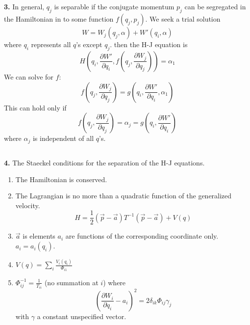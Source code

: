 \documentclass{article}
\begin{document}
	\subsection*{}
	\textbf{3.} In general, $q_j$ is separable if the conjugate momentum $p_j$ can be segregated in the Hamiltonian in to some function $f(q_j, p_j)$.
	We seek a trial solution
	\begin{equation*}
		W = W_j(q_j, \alpha) + W'(q_i, \alpha)
	\end{equation*}
	where $q_i$ represents all $q$'s except $q_j$.
	then the H-J equation is
	\begin{equation*}
		H\left(q_i, \frac{\partial W'}{\partial q_i}, f\left(q_j, \frac{\partial W_j}{\partial q_j}\right)\right) = \alpha_1
	\end{equation*}
	We can solve for $f$:
	\begin{equation*}
		f\left(q_j, \frac{\partial W_j}{\partial q_j}\right) = g\left(q_i, \frac{\partial W'}{\partial q_i}, \alpha_1\right)
	\end{equation*}
	This can hold only if
	\begin{equation*}
		f\left(q_j, \frac{\partial W_j}{\partial q_j}\right) = \alpha_j = g\left(q_i, \frac{\partial W'}{\partial q_i}\right)
	\end{equation*}
	where $\alpha_j$ is independent of all $q$'s.
	
	\subsection*{}
	\textbf{4.} The Staeckel conditions for the separation of the H-J equations.
	\begin{enumerate}
		\item The Hamiltonian is conserved.
		\item The Lagrangian is no more than a quadratic function of the generalized velocity.
		\begin{equation*}
			H = \frac{1}{2} (\vec{p} - \vec{a}) T^{-1} (\vec{p} - \vec{a}) + V(q)
		\end{equation*}
		\item $\vec{a}$ is elements $a_i$ are functions of the corresponding coordinate only. $a_i = a_i(q_i)$.
		\item $V(q) = \sum_i \frac{V_i(q_i)}{\Phi_{i1}}$
		\item $\Phi_{ij}^{-1} = \frac{1}{T_{ii}}$ (no summation at $i$) where
		\begin{equation*}
			\left(\frac{\partial W_i}{\partial q_i} - a_i\right)^2 = 2 \delta_{ik} \Phi_{ij} \gamma_j
		\end{equation*}
		with $\gamma$ a constant unspecified vector.
	\end{enumerate}
	
\end{document}
